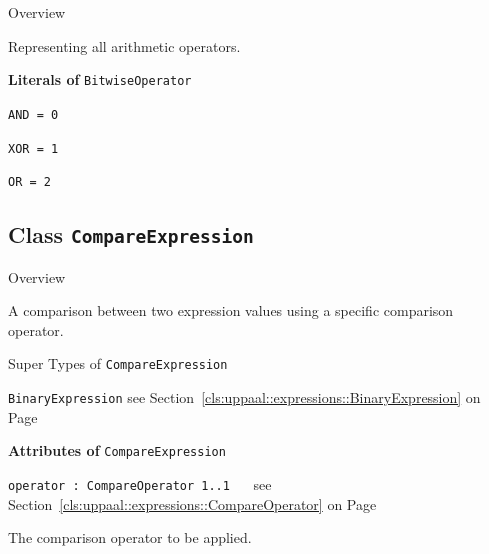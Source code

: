 	\begin{longdescription}
		\item[Overview] 		
				

	

		Representing all arithmetic operators.		
	
		\item[\textbf{Literals of} \texttt{BitwiseOperator}] ~
		\begin{longdescription}
			
\item[\texttt{AND = 0}] ~
\nopagebreak

\item[\texttt{XOR = 1}] ~
\nopagebreak

\item[\texttt{OR = 2}] ~
\nopagebreak
		\end{longdescription}
	\end{longdescription}
	
	

\subsection{Class \bfseries \texttt{CompareExpression}\normalfont}
\label{cls:uppaal::expressions::CompareExpression} 
	
	\begin{longdescription}
		\item[Overview] 		
				

	

		A comparison between two expression values using a specific comparison operator.		
		\item[Super Types of \texttt{CompareExpression}] ~
			\begin{longdescription}
				\item[\texttt{BinaryExpression}] see Section~\ref{cls:uppaal::expressions::BinaryExpression} on Page~\pageref{cls:uppaal::expressions::BinaryExpression}						\end{longdescription}
		
	
			\item[\textbf{Attributes of} \texttt{CompareExpression}] ~
			\begin{longdescription}
	\item[\texttt{operator : CompareOperator 	\symbol{"5B}1..1\symbol{"5D}
}] ~
	see Section~\ref{cls:uppaal::expressions::CompareOperator} on Page~\pageref{cls:uppaal::expressions::CompareOperator}
	
	\nopagebreak
		
				

	

		The comparison operator to be applied.		
			\end{longdescription}
	
	\end{longdescription}
	

